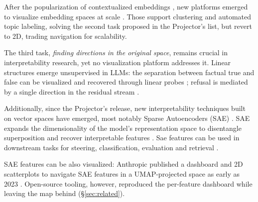 \documentclass[11pt]{article}
\begin{document}
After the popularization of contextualized embeddings \cite{devlin2019bertpretrainingdeepbidirectional, reimers-gurevych-2019-sentence}, new platforms emerged to visualize embedding spaces at scale \cite{wang2023wizmapscalableinteractivevisualization, nomic2022atlas, johnson2024latentscope, ren2025embeddingatlaslowfrictioninteractive}. Those support clustering and automated topic labeling, solving the second task proposed in the Projector's list, but revert to 2D, trading navigation for scalability. 



The third task, \textit{finding directions in the original space}, remains crucial in interpretability research, yet no visualization platform addresses it. Linear structures emerge unsupervised in LLMs: the separation between factual true and false can be visualized and recovered through linear probes \cite{Marks2023TheGO}; refusal is mediated by a single direction in the residual stream \cite{arditi2024refusallanguagemodelsmediated}. 

Additionally, since the Projector's release, new interpretability techniques built on vector spaces have emerged, most notably Sparse Autoencoders (SAE) \cite{elhage2022superposition, bricken2023monosemanticity}. SAE expands the dimensionality of the model's representation space to disentangle superposition \cite{elhage2022superposition} and recover interpretable features \cite{templeton2024scaling}. Sae features can be used in downstream tasks for steering, classification, evaluation
and retrieval \cite{jiang2025interpretableembeddingssparseautoencoders,
deng2026qwenscopeturningsparsefeatures}. 


SAE features can be also visualized: Anthropic published a dashboard and 2D scatterplots to navigate SAE features in a UMAP-projected space as early as 2023 \cite{bricken2023monosemanticity, templeton2024scaling}. Open-source tooling, however, reproduced the per-feature dashboard while leaving the map behind (\S\ref{sec:related}).
\end{document}
